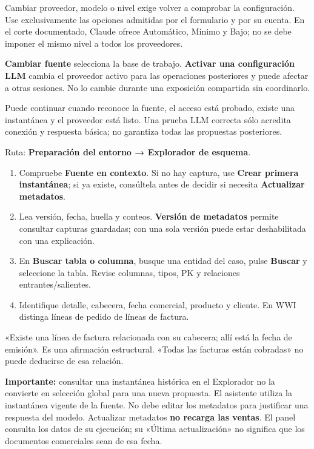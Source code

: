 Cambiar proveedor, modelo o nivel exige volver a comprobar la configuración. Use exclusivamente las opciones admitidas por el formulario y por su cuenta. En el corte documentado, Claude ofrece Automático, Mínimo y Bajo; no se debe imponer el mismo nivel a todos los proveedores.
\begin{note}
\textbf{Cambiar fuente} selecciona la base de trabajo. \textbf{Activar una configuración LLM} cambia el proveedor activo para las operaciones posteriores y puede afectar a otras sesiones. No lo cambie durante una exposición compartida sin coordinarlo.
\end{note}
\begin{good}
Puede continuar cuando reconoce la fuente, el acceso está probado, existe una instantánea y el proveedor está listo. Una prueba LLM correcta sólo acredita conexión y respuesta básica; no garantiza todas las propuestas posteriores.
\end{good}

Ruta: \textbf{Preparación del entorno → Explorador de esquema}.
\begin{enumerate}
\item Compruebe \textbf{Fuente en contexto}. Si no hay captura, use \textbf{Crear primera instantánea}; si ya existe, consúltela antes de decidir si necesita \textbf{Actualizar metadatos}.
\item Lea versión, fecha, huella y conteos. \textbf{Versión de metadatos} permite consultar capturas guardadas; con una sola versión puede estar deshabilitada con una explicación.
\item En \textbf{Buscar tabla o columna}, busque una entidad del caso, pulse \textbf{Buscar} y seleccione la tabla. Revise columnas, tipos, PK y relaciones entrantes/salientes.
\item Identifique detalle, cabecera, fecha comercial, producto y cliente. En WWI distinga líneas de pedido de líneas de factura.
\end{enumerate}
\begin{good}
«Existe una línea de factura relacionada con su cabecera; allí está la fecha de emisión». Es una afirmación estructural. «Todas las facturas están cobradas» no puede deducirse de esa relación.
\end{good}
\textbf{Importante:} consultar una instantánea histórica en el Explorador no la convierte en selección global para una nueva propuesta. El asistente utiliza la instantánea vigente de la fuente. No debe editar los metadatos para justificar una respuesta del modelo.
Actualizar metadatos \textbf{no recarga las ventas}. El panel consulta los datos de su ejecución; su «Última actualización» no significa que los documentos comerciales sean de esa fecha.

